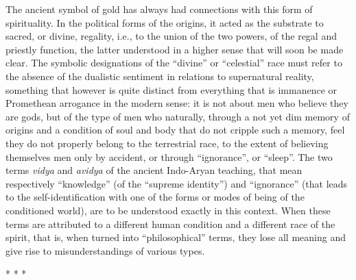 The ancient symbol of gold has always had connections with this form of spirituality. In the political forms of the origins, it acted as the substrate to sacred, or divine, regality, i.e., to the union of the two powers, of the regal and priestly function, the latter understood in a higher sense that will soon be made clear. The symbolic designations of the ``divine'' or ``celestial'' race must refer to the absence of the dualistic sentiment in relations to supernatural reality, something that however is quite distinct from everything that is immanence or Promethean arrogance in the modern sense: it is not about men who believe they are gods, but of the type of men who naturally, through a not yet dim memory of origins and a condition of soul and body that do not cripple such a memory, feel they do not properly belong to the terrestrial race, to the extent of believing themselves men only by accident, or through ``ignorance'', or ``sleep''. The two terms
\emph{vidya} and \emph{avidya} of the ancient Indo-Aryan teaching, that mean respectively ``knowledge'' (of the ``supreme identity'') and ``ignorance'' (that leads to the self-identification with one of the forms or modes of being of the conditioned world), are to be understood exactly in this context. When these terms are attributed to a different human condition and a different race of the spirit, that is, when turned into ``philosophical'' terms, they lose all meaning and give rise to misunderstandings of various types.



\begin{center}* * *\end{center}

